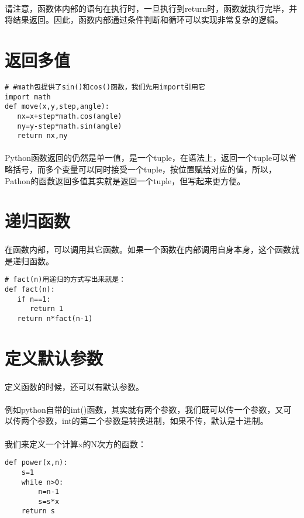\documentclass{article}
\begin{document}
\begin{CJK}{UTF8}{gbsn}
\paragraph{}
请注意，函数体内部的语句在执行时，一旦执行到return时，函数就执行完毕，并将结果返回。因此，函数内部通过条件判断和循环可以实现非常复杂的逻辑。
\section{返回多值}
\begin{verbatim}
# #math包提供了sin()和cos()函数，我们先用import引用它
import math
def move(x,y,step,angle):
   nx=x+step*math.cos(angle)
   ny=y-step*math.sin(angle)
   return nx,ny
\end{verbatim}
\paragraph{}
Python函数返回的仍然是单一值，是一个tuple，在语法上，返回一个tuple可以省略括号，而多个变量可以同时接受一个tuple，按位置赋给对应的值，所以，Pathon的函数返回多值其实就是返回一个tuple，但写起来更方便。
\section{递归函数}
\paragraph{}
在函数内部，可以调用其它函数。如果一个函数在内部调用自身本身，这个函数就是递归函数。
\begin{verbatim}
# fact(n)用递归的方式写出来就是：
def fact(n):
   if n==1:
      return 1
   return n*fact(n-1)
\end{verbatim}
\section{定义默认参数}
\paragraph{}
定义函数的时候，还可以有默认参数。
\paragraph{}
例如python自带的int()函数，其实就有两个参数，我们既可以传一个参数，又可以传两个参数，int的第二个参数是转换进制，如果不传，默认是十进制。
\paragraph{}
我们来定义一个计算x的N次方的函数：
\begin{verbatim}
def power(x,n):
    s=1
    while n>0:
        n=n-1
        s=s*x
    return s
\end{verbatim}

\end{CJK}
\end{document}
